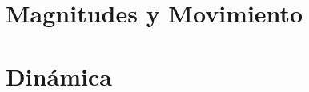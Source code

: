 \documentclass[12pt, a4paper, twoside]{book}
\begin{document}




\chapter{Magnitudes y Movimiento}

% 
% 
% 

% 
% 
% 

% 
% 
% 

% 
% 
% 

% 
% 
% 

% 
% 
% 

% 
% 
% 

% 
% 
% 

\chapter{Dinámica}

% 
% 
% 

% 
% 
% 
\end{document}
